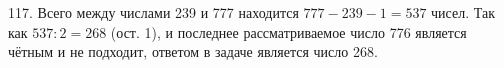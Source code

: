 117. Всего между числами 239 и 777 находится $777-239-1=537$ чисел. Так как $537:2=268$ (ост. 1), и последнее рассматриваемое число 776 является чётным и не подходит, ответом в задаче является число 268.\\
